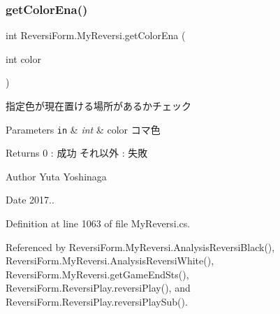 \subsubsection{\texorpdfstring{get\+Color\+Ena()}{getColorEna()}}
{\footnotesize\ttfamily int Reversi\+Form.\+My\+Reversi.\+get\+Color\+Ena (\begin{DoxyParamCaption}\item[{int}]{color }\end{DoxyParamCaption})}



指定色が現在置ける場所があるかチェック 


\begin{DoxyParams}[1]{Parameters}
\mbox{\tt in}  & {\em int} & color コマ色 \\
\hline
\end{DoxyParams}
\begin{DoxyReturn}{Returns}
0 \+: 成功 それ以外 \+: 失敗 
\end{DoxyReturn}
\begin{DoxyAuthor}{Author}
Yuta Yoshinaga 
\end{DoxyAuthor}
\begin{DoxyDate}{Date}
2017.. 
\end{DoxyDate}


Definition at line 1063 of file My\+Reversi.\+cs.



Referenced by Reversi\+Form.\+My\+Reversi.\+Analysis\+Reversi\+Black(), Reversi\+Form.\+My\+Reversi.\+Analysis\+Reversi\+White(), Reversi\+Form.\+My\+Reversi.\+get\+Game\+End\+Sts(), Reversi\+Form.\+Reversi\+Play.\+reversi\+Play(), and Reversi\+Form.\+Reversi\+Play.\+reversi\+Play\+Sub().

